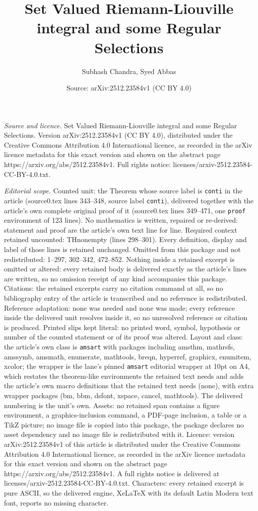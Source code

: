 \documentclass[10pt,a4paper]{amsart}
\title[Set Valued Riemann-Liouville integral and some Regular Selec]{Set Valued Riemann-Liouville integral and some Regular Selections}
\author{Subhash Chandra, Syed Abbas}
\date{Source: arXiv:2512.23584v1 (CC BY 4.0)}
\begin{document}
\maketitle

\noindent\emph{Source and licence.} Set Valued Riemann-Liouville integral and some Regular Selections. Version arXiv:2512.23584v1 (CC BY 4.0), distributed under the Creative Commons Attribution 4.0 International licence, as recorded in the arXiv licence metadata for this exact version and shown on the abstract page https://arxiv.org/abs/2512.23584v1. Full rights notice: licenses/arxiv-2512.23584-CC-BY-4.0.txt.\par\smallskip

\noindent\textit{Editorial scope.} Counted unit: the Theorem whose source label is \texttt{conti} in the article (source0.tex lines 343--348, source label \texttt{conti}), delivered together with the article's own complete original proof of it (source0.tex lines 349--471, one \texttt{proof} environment of 123 lines). No mathematics is written, repaired or re-derived: statement and proof are the article's own text line for line. Required context retained uncounted: THnonempty (lines 298--301). Every definition, display and label of those lines is retained unchanged. Omitted from this package and not redistributed: 1--297, 302--342, 472--852. Nothing inside a retained excerpt is omitted or altered: every retained body is delivered exactly as the article's lines are written, so no omission receipt of any kind accompanies this package. Citations: the retained excerpts carry no citation command at all, so no bibliography entry of the article is transcribed and no reference is redistributed. Reference adaptation: none was needed and none was made; every reference inside the delivered unit resolves inside it, so no unresolved reference or citation is produced. Printed slips kept literal: no printed word, symbol, hypothesis or number of the counted statement or of its proof was altered. Layout and class: the article's own class is \texttt{amsart} with packages including amsthm, mathrsfs, amssymb, amsmath, enumerate, mathtools, breqn, hyperref, graphicx, enumitem, xcolor; the wrapper is the lane's pinned \texttt{amsart} editorial wrapper at 10pt on A4, which restates the theorem-like environments the retained text needs and adds the article's own macro definitions that the retained text needs (none), with extra wrapper packages (bm, bbm, dsfont, xspace, cancel, mathtools). The delivered numbering is the unit's own. Assets: no retained span contains a figure environment, a graphics-inclusion command, a PDF-page inclusion, a table or a TikZ picture; no image file is copied into this package, the package declares no asset dependency and no image file is redistributed with it. Licence: version arXiv:2512.23584v1 of this article is distributed under the Creative Commons Attribution 4.0 International licence, as recorded in the arXiv licence metadata for this exact version and shown on the abstract page https://arxiv.org/abs/2512.23584v1. A full rights notice is delivered at licenses/arxiv-2512.23584-CC-BY-4.0.txt. Characters: every retained excerpt is pure ASCII, so the delivered engine, XeLaTeX with its default Latin Modern text font, reports no missing character.
\end{document}

